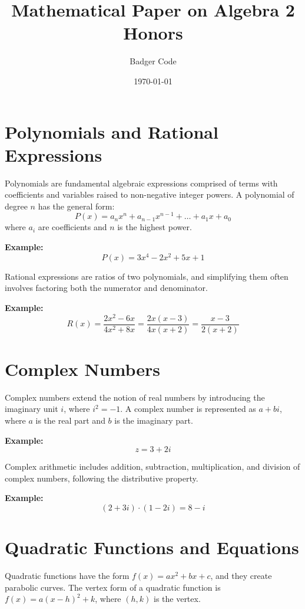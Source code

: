 \documentclass{article}
\title{Mathematical Paper on Algebra 2 Honors}
\author{Badger Code}
\date{\today}
\begin{document}
\maketitle

\section{Polynomials and Rational Expressions}
Polynomials are fundamental algebraic expressions comprised of terms with coefficients and variables raised to non-negative integer powers. A polynomial of degree \(n\) has the general form:
\[ P(x) = a_nx^n + a_{n-1}x^{n-1} + \ldots + a_1x + a_0 \]
where \(a_i\) are coefficients and \(n\) is the highest power.

\begin{framed}
\textbf{Example:}
\[ P(x) = 3x^4 - 2x^2 + 5x + 1 \]
\end{framed}

Rational expressions are ratios of two polynomials, and simplifying them often involves factoring both the numerator and denominator.

\begin{framed}
\textbf{Example:}
\[ R(x) = \frac{2x^2 - 6x}{4x^2 + 8x} = \frac{2x(x - 3)}{4x(x + 2)} = \frac{x - 3}{2(x + 2)} \]
\end{framed}

\section{Complex Numbers}
Complex numbers extend the notion of real numbers by introducing the imaginary unit \(i\), where \(i^2 = -1\). A complex number is represented as \(a + bi\), where \(a\) is the real part and \(b\) is the imaginary part.

\begin{framed}
\textbf{Example:}
\[ z = 3 + 2i \]
\end{framed}

Complex arithmetic includes addition, subtraction, multiplication, and division of complex numbers, following the distributive property.

\begin{framed}
\textbf{Example:}
\[ (2 + 3i) \cdot (1 - 2i) = 8 - i \]
\end{framed}

\section{Quadratic Functions and Equations}
Quadratic functions have the form \(f(x) = ax^2 + bx + c\), and they create parabolic curves. The vertex form of a quadratic function is \(f(x) = a(x - h)^2 + k\), where \((h, k)\) is the vertex.
\end{document}
